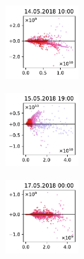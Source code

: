 \begin{figure}[H]
    \centering
    \begin{subfigure}
        \centering
        \includegraphics[width=0.30\textwidth,valign=t]{evaluation/figures/perturbations/perturbation-14.05.2018:10.00-biogenic-div-1.01.pdf}
    \end{subfigure}
    \begin{subfigure}
        \centering
        \includegraphics[width=0.30\textwidth,valign=t]{evaluation/figures/perturbations/perturbation-15.05.2018:19.00-biogenic-div-1.01.pdf}
    \end{subfigure}
    \begin{subfigure}
        \centering
        \includegraphics[width=0.30\textwidth,valign=t]{evaluation/figures/perturbations/perturbation-17.05.2018:00.00-biogenic-div-1.01.pdf}
    \end{subfigure}


\end{figure}
